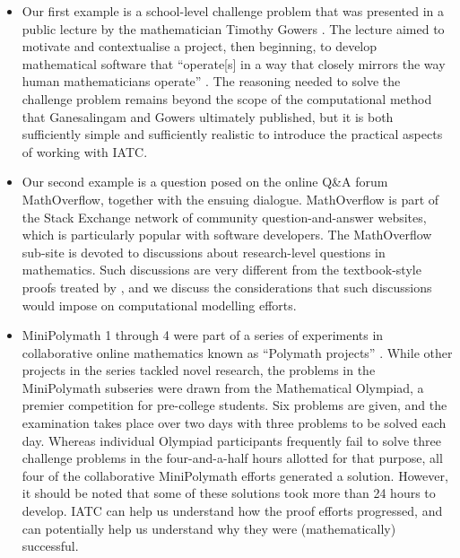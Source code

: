 \documentclass[smallextended,oneside]{svjour3}       %
\let\cite\citep
\newcommand\nothing[1]{#1}
\let\paragraph\nothing
\begin{document}
\begin{itemize}
\item Our first example is a school-level challenge problem that was
  presented in a public lecture by the mathematician Timothy Gowers
  \cite{gowers-talk}.  The lecture aimed to motivate and contextualise
  a project, then beginning, to develop mathematical software that
  ``operate[s] in a way that closely mirrors the way human
  mathematicians operate'' \cite[p.~255]{ganesalingam2016fully}.  The
  reasoning needed to solve the challenge problem remains beyond the
  scope of the computational method that Ganesalingam and Gowers
  ultimately published, but it is both sufficiently simple and
  sufficiently realistic to introduce the practical aspects of
  working with IATC.
\item Our second example is a question posed on the online Q\&A forum
  MathOverflow, together with the ensuing dialogue.  MathOverflow is
  part of the Stack Exchange network of community question-and-answer
  websites, which is particularly popular with software developers.
  The MathOverflow sub-site is devoted to discussions about
  research-level questions in mathematics.  Such discussions are very
  different from the textbook-style proofs treated by
  \cite{ganesalingam2016fully}, and we discuss the considerations that
  such discussions would impose on computational modelling efforts.
\item \paragraph{MiniPolymath 1 through 4 were part of a series of
  experiments in collaborative online mathematics known as ``Polymath
  projects'' \cite{polymath-wiki}.}  While other projects in the series
  tackled novel research, the problems in the MiniPolymath subseries
  were drawn from the Mathematical Olympiad, a premier competition for
  pre-college students.
Six problems are given, and the examination takes place over
two days with three problems to be solved each day.
Whereas individual Olympiad participants
frequently fail to solve three challenge problems in the
four-and-a-half hours allotted for that purpose, all four of the
collaborative MiniPolymath efforts generated a solution.
However, it should be noted that some of these solutions
took more than 24 hours to develop.
IATC can help us understand how the proof efforts progressed, and can
potentially help us understand why they were (mathematically)
successful.
\end{itemize}
\end{document}
